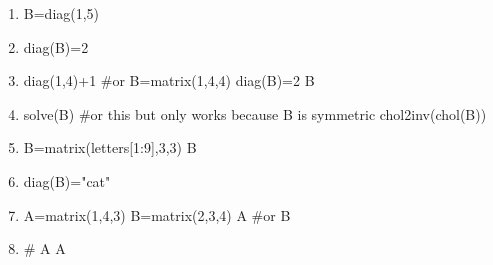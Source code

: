 \begin{enumerate}
\item
\begin{Schunk}
\begin{Sinput}
 B=diag(1,5)
\end{Sinput}
\end{Schunk}

\item
\begin{Schunk}
\begin{Sinput}
 diag(B)=2
\end{Sinput}
\end{Schunk}

\item
\begin{Schunk}
\begin{Sinput}
 diag(1,4)+1
 #or
 B=matrix(1,4,4)
 diag(B)=2
 B
\end{Sinput}
\end{Schunk}

\item
\begin{Schunk}
\begin{Sinput}
 solve(B)
 #or this but only works because B is symmetric
 chol2inv(chol(B))
\end{Sinput}
\end{Schunk}

\item
\begin{Schunk}
\begin{Sinput}
 B=matrix(letters[1:9],3,3)
 B
\end{Sinput}
\end{Schunk}

\item
\begin{Schunk}
\begin{Sinput}
 diag(B)="cat"
\end{Sinput}
\end{Schunk}

\item
\begin{Schunk}
\begin{Sinput}
 A=matrix(1,4,3)
 B=matrix(2,3,4)
 A%*%B
 #or
 B%*%A
\end{Sinput}
\end{Schunk}

\item
\begin{Schunk}
\begin{Sinput}
 # A%*%A #throws an error
 A%*%t(A) #works
\end{Sinput}
\end{Schunk}


\end{enumerate}
